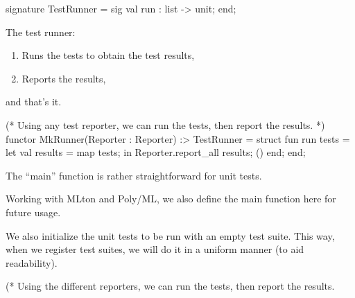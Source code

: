 \nwenddocs{}\endmoddef\nwstartdeflinemarkup\nwenddeflinemarkup
signature TestRunner = sig
  val run :  list -> unit;
end;
\nwendcode{}\nwdocspar

\begin{node}
The test runner:
\begin{enumerate}
\item Runs the tests to obtain the test results,
\item Reports the results,
\end{enumerate}
and that's it.
\end{node}

\nwenddocs{}\endmoddef\nwstartdeflinemarkup\nwenddeflinemarkup
(*
Using any test reporter, we can run the tests, then
report the results.
*)
functor MkRunner(Reporter : Reporter) :> TestRunner = struct
  fun run tests =
    let
      val results = map  tests;
    in
      Reporter.report_all results;
      ()
    end;
end;
\nwendcode{}\nwdocspar

\begin{node}
The ``main'' function is rather straightforward for unit tests.

Working with MLton and Poly/ML, we also define the {\Tt{}main\nwendquote} function here
for future usage.

We also initialize the unit tests to be run with an empty test
suite. This way, when we register test suites, we will do it in a
uniform manner (to aid readability).
\end{node}

\nwenddocs{}\endmoddef\nwstartdeflinemarkup\nwenddeflinemarkup
(*
Using the different reporters, we can run the tests, then
report the results.

